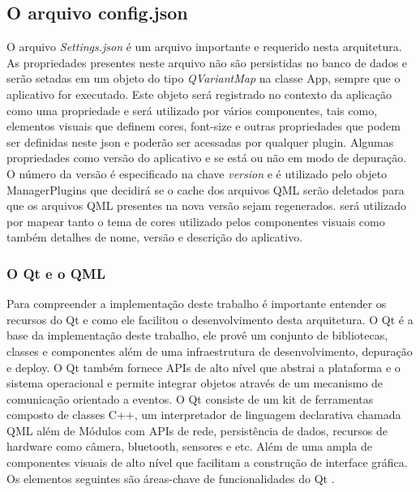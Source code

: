 \subsection{O arquivo config.json}\label{sec:solucao-desenvolvida}
O arquivo \textit{Settings.json} é um arquivo importante e requerido nesta arquitetura. As propriedades presentes neste arquivo não são persistidas no banco de dados e serão setadas em um objeto do tipo \textit{QVariantMap} na classe App, sempre que o aplicativo for executado. Este objeto será registrado no contexto da aplicação como uma propriedade e será utilizado por vários componentes, tais como, elementos visuais que definem cores, font-size e outras propriedades que podem ser definidas neste json e poderão ser acessadas por qualquer plugin. Algumas propriedades como versão do aplicativo e se está ou não em modo de depuração. O número da versão é especificado na chave \textit{version} e é utilizado pelo objeto ManagerPlugins que decidirá se o cache dos arquivos QML serão deletados para que os arquivos QML presentes na nova versão sejam regenerados. será utilizado por mapear tanto o tema de cores utilizado pelos componentes visuais como também detalhes de nome, versão e descrição do aplicativo.


\subsubsection{O Qt e o QML}\label{sec:solucao-desenvolvida}
Para compreender a implementação deste trabalho é importante entender os recursos do Qt e como ele facilitou o desenvolvimento desta arquitetura. O Qt é a base da implementação deste trabalho, ele provê um conjunto de bibliotecas, classes e componentes além de uma infraestrutura de desenvolvimento, depuração e deploy. O Qt também fornece APIs de alto nível que abstrai a plataforma e o sistema operacional e permite integrar objetos através de um mecanismo de comunicação orientado a eventos. O Qt consiste de um kit de ferramentas composto de classes C++, um interpretador de linguagem declarativa chamada QML além de Módulos com APIs de rede, persistência de dados, recursos de hardware como câmera, bluetooth, sensores e etc. Além de uma ampla de componentes visuais de alto nível que facilitam a construção de interface gráfica. Os elementos seguintes são áreas-chave de funcionalidades do Qt \cite{qt_overviews}.

